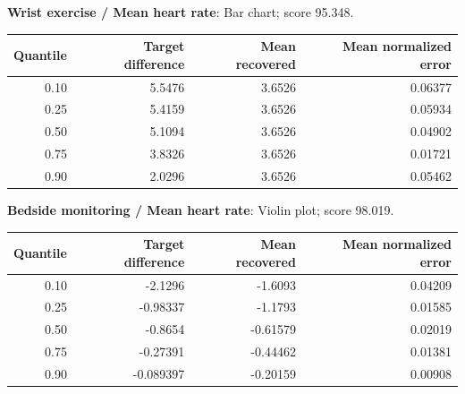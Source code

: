 \begin{minipage}{\linewidth}\textbf{Wrist exercise / Mean heart rate}: Bar chart; score 95.348.
\begin{center}\begin{tabular}{rrrr}\toprule
Quantile & Target difference & Mean recovered & Mean normalized error\\\midrule
0.10 & 5.5476 & 3.6526 & 0.06377\\
0.25 & 5.4159 & 3.6526 & 0.05934\\
0.50 & 5.1094 & 3.6526 & 0.04902\\
0.75 & 3.8326 & 3.6526 & 0.01721\\
0.90 & 2.0296 & 3.6526 & 0.05462\\
\bottomrule\end{tabular}\end{center}\end{minipage}\par\medskip
\begin{minipage}{\linewidth}\textbf{Bedside monitoring / Mean heart rate}: Violin plot; score 98.019.
\begin{center}\begin{tabular}{rrrr}\toprule
Quantile & Target difference & Mean recovered & Mean normalized error\\\midrule
0.10 & -2.1296 & -1.6093 & 0.04209\\
0.25 & -0.98337 & -1.1793 & 0.01585\\
0.50 & -0.8654 & -0.61579 & 0.02019\\
0.75 & -0.27391 & -0.44462 & 0.01381\\
0.90 & -0.089397 & -0.20159 & 0.00908\\
\bottomrule\end{tabular}\end{center}\end{minipage}\par\medskip
